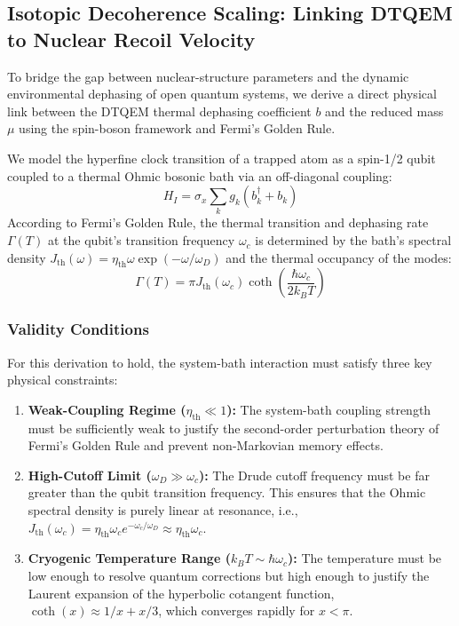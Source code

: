 \documentclass[reprint,amsmath,amssymb,aps,pra,superscriptaddress]{revtex4-2}
\begin{document}
\subsection{Isotopic Decoherence Scaling: Linking DTQEM to Nuclear Recoil Velocity}

To bridge the gap between nuclear-structure parameters and the dynamic environmental dephasing of open quantum systems, we derive a direct physical link between the DTQEM thermal dephasing coefficient $b$ and the reduced mass $\mu$ using the spin-boson framework and Fermi's Golden Rule.

We model the hyperfine clock transition of a trapped atom as a spin-1/2 qubit coupled to a thermal Ohmic bosonic bath via an off-diagonal coupling:
\begin{equation}
    H_I = \sigma_x \sum_k g_k (b_k^\dagger + b_k)
\end{equation}
According to Fermi's Golden Rule, the thermal transition and dephasing rate $\Gamma(T)$ at the qubit's transition frequency $\omega_c$ is determined by the bath's spectral density $J_{\text{th}}(\omega) = \eta_{\text{th}} \omega \exp(-\omega/\omega_D)$ and the thermal occupancy of the modes:
\begin{equation}
    \Gamma(T) = \pi J_{\text{th}}(\omega_c) \coth\left( \frac{\hbar \omega_c}{2 k_B T} \right)
\end{equation}

\subsubsection{Validity Conditions}

For this derivation to hold, the system-bath interaction must satisfy three key physical constraints:
\begin{enumerate}
    \item \textbf{Weak-Coupling Regime ($\eta_{\text{th}} \ll 1$):} The system-bath coupling strength must be sufficiently weak to justify the second-order perturbation theory of Fermi's Golden Rule and prevent non-Markovian memory effects.
    \item \textbf{High-Cutoff Limit ($\omega_D \gg \omega_c$):} The Drude cutoff frequency must be far greater than the qubit transition frequency. This ensures that the Ohmic spectral density is purely linear at resonance, i.e., $J_{\text{th}}(\omega_c) = \eta_{\text{th}} \omega_c e^{-\omega_c/\omega_D} \approx \eta_{\text{th}} \omega_c$.
    \item \textbf{Cryogenic Temperature Range ($k_B T \sim \hbar \omega_c$):} The temperature must be low enough to resolve quantum corrections but high enough to justify the Laurent expansion of the hyperbolic cotangent function, $\coth(x) \approx 1/x + x/3$, which converges rapidly for $x < \pi$.
\end{enumerate}
\end{document}
